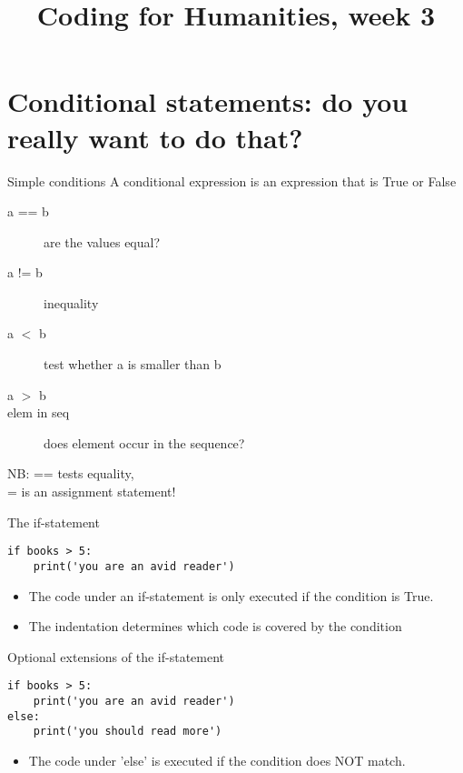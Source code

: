 \documentclass{beamer}
\title{Coding for Humanities, week 3}
\begin{document}
\begin{frame}
 \titlepage
\end{frame}

\begin{frame}
 \tableofcontents
\end{frame}

\frame{\tableofcontents[currentsection]}
\section{Conditional statements: do you really want to do that?}
\begin{frame}{Simple conditions}
    A conditional expression is
    an expression that is True or False
    \begin{description}
        \item[a == b] are the values equal?
        \item[a != b] inequality
        \item[a $<$ b] test whether a is smaller than b
        \item[a $>$ b]
        \item[elem in seq] does element occur in the sequence?
    \end{description}

    NB: == tests equality, \\
        = is an assignment statement!
\end{frame}

\begin{frame}[fragile]{The if-statement}
\begin{lstlisting}
if books > 5:
    print('you are an avid reader')
\end{lstlisting}

\begin{itemize}
    \item The code under an if-statement is only executed
        if the condition is True.
    \item The indentation determines which code is covered
        by the condition
\end{itemize}
\end{frame}


\begin{frame}[fragile]{Optional extensions of the if-statement}
\begin{lstlisting}
if books > 5:
    print('you are an avid reader')
else:
    print('you should read more')
\end{lstlisting}

\begin{itemize}
    \item The code under 'else' is executed if the condition does NOT match.
\end{itemize}
\end{frame}
\end{document}
